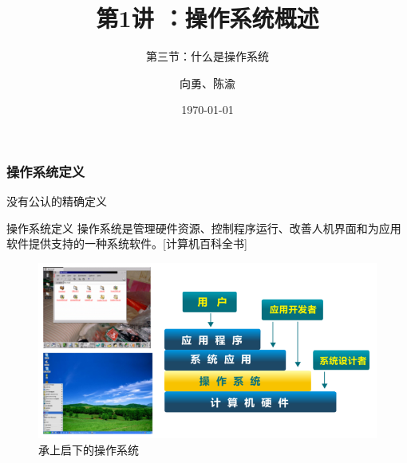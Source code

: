 \documentclass[UTF8]{ctexbeamer}
\title[第1讲]{第1讲 ：操作系统概述} %
\subtitle{第三节：什么是操作系统}
\author{向勇、陈渝} %
\institute[清华大学] %
{
清华大学计算机系 \\ %
\medskip
\textit{xyong,yuchen@tsinghua.edu.cn} %
}
\date{\today} %
\begin{document}
\begin{frame}
\titlepage %
\end{frame}

%
%


\begin{frame}

\frametitle{操作系统定义}


没有公认的精确定义

\begin{block}{操作系统定义}
操作系统是管理硬件资源、控制程序运行、改善人机界面和为应用软件提供支持的一种系统软件。[计算机百科全书]
\end{block}


\begin{figure}
	\centering
	\includegraphics[width=0.6\linewidth]{os-position}
	\caption{承上启下的操作系统}
\end{figure}

\end{frame}
\end{document}
